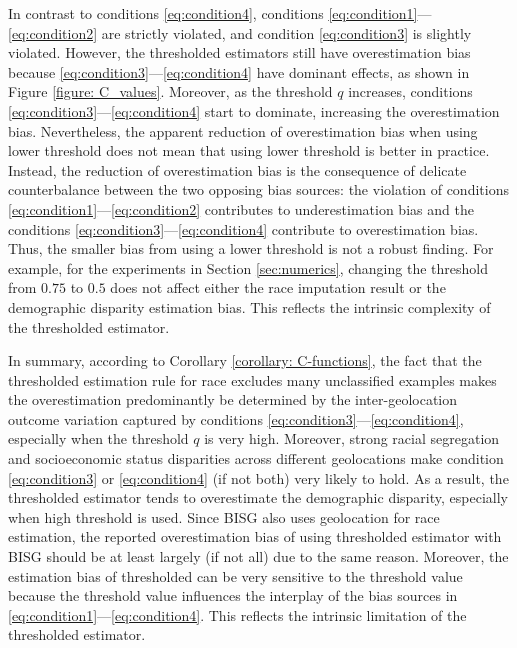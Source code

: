 In contrast to conditions \eqref{eq:condition4}, conditions \eqref{eq:condition1}---\eqref{eq:condition2} are strictly violated, and condition \eqref{eq:condition3} is slightly violated.
However, the thresholded estimators still have overestimation bias because \eqref{eq:condition3}---\eqref{eq:condition4} have dominant effects, as shown in Figure \ref{figure: C_values}.
Moreover, as the threshold $q$ increases, conditions \eqref{eq:condition3}---\eqref{eq:condition4} start to dominate, increasing the overestimation bias.
Nevertheless, the apparent reduction of overestimation bias when using lower threshold does not mean that using lower threshold is better in practice. Instead, the reduction of overestimation bias is the consequence of delicate counterbalance between the two opposing bias sources: the violation of conditions \eqref{eq:condition1}---\eqref{eq:condition2} contributes to underestimation bias and the conditions \eqref{eq:condition3}---\eqref{eq:condition4} contribute to overestimation bias. Thus, the smaller bias from using a lower threshold is not a robust finding. For example, for the experiments in Section \ref{sec:numerics}, changing the threshold from $0.75$ to $0.5$ does not affect either the race imputation result or the demographic disparity estimation bias. This reflects the intrinsic complexity of the thresholded estimator.

In summary, according to Corollary \ref{corollary: C-functions}, the fact that the thresholded estimation rule for race excludes many unclassified examples makes the overestimation predominantly be determined by the inter-geolocation outcome variation captured by conditions \eqref{eq:condition3}---\eqref{eq:condition4}, especially when the threshold $q$ is very high. Moreover, strong racial segregation and socioeconomic status disparities across different geolocations make condition \eqref{eq:condition3} or \eqref{eq:condition4} (if not both) very likely to hold. As a result, the thresholded estimator tends to overestimate the demographic disparity, especially when high threshold is used. Since BISG also uses geolocation for race estimation, the reported overestimation bias of using thresholded estimator with BISG should be at least largely (if not all) due to the same reason. Moreover, the estimation bias of thresholded can be very sensitive to the threshold value because the threshold value influences the interplay of the bias sources in \eqref{eq:condition1}---\eqref{eq:condition4}. This reflects the intrinsic limitation of the thresholded estimator.


